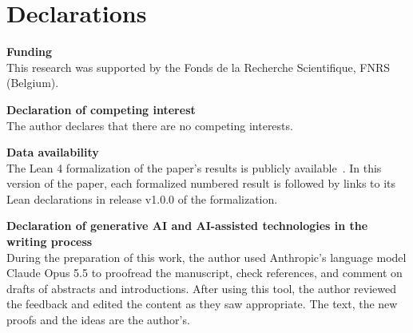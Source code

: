 \section*{Declarations}
\textbf{Funding} \\
\noindent
This research was supported by the Fonds de la Recherche Scientifique, FNRS (Belgium).

\smallskip
\noindent\textbf{Declaration of competing interest} \\
The author declares that there are no competing interests.

\smallskip
\noindent\textbf{Data availability}\\
The Lean 4 formalization of the paper's results is publicly available~\cite{forsman2026ulmerlean}. In this version of the paper, each formalized numbered result is followed by links to its Lean declarations in release v1.0.0 of the formalization.

\smallskip
\noindent\textbf{Declaration of generative AI and AI-assisted technologies in the writing process} \\
During the preparation of this work, the author used Anthropic's language model Claude Opus 5.5 to proofread the manuscript, check references, and comment on drafts of abstracts and introductions. After using this tool, the author reviewed the feedback and edited the content as they saw appropriate. The text, the new proofs and the ideas are the author's.
